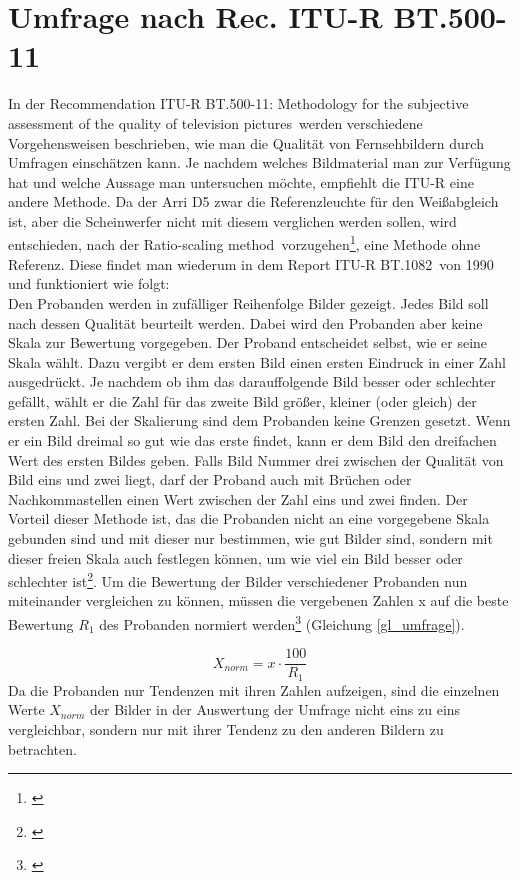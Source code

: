 \section{Umfrage nach Rec. ITU-R  BT.500-11}
\label{sec_umfrageitu}
In der \glqq Recommendation ITU-R BT.500-11: Methodology for the subjective assessment of the 
quality of television pictures\grqq\ werden verschiedene Vorgehensweisen beschrieben, wie man die Qualität von Fernsehbildern durch Umfragen einschätzen kann. Je nachdem welches Bildmaterial man zur Verfügung hat und welche Aussage man untersuchen möchte, empfiehlt die ITU-R eine andere Methode. Da der Arri D5 zwar die Referenzleuchte für den Weißabgleich ist, aber die Scheinwerfer nicht mit diesem verglichen werden sollen, wird entschieden, nach der \glqq Ratio-scaling method\grqq\ vorzugehen\footnote{\cite[10]{itu}}, eine Methode ohne Referenz. Diese findet man wiederum in dem \glqq Report ITU-R BT.1082\grqq\ von 1990 und funktioniert wie folgt:\\
Den Probanden werden in zufälliger Reihenfolge Bilder gezeigt. Jedes  Bild soll nach dessen Qualität beurteilt werden. Dabei wird den Probanden aber keine Skala zur Bewertung vorgegeben. Der Proband entscheidet selbst, wie er seine Skala wählt. Dazu vergibt er dem ersten Bild einen ersten Eindruck in einer Zahl ausgedrückt. Je nachdem ob ihm das darauffolgende Bild besser oder schlechter gefällt, wählt er die Zahl für das zweite Bild größer, kleiner (oder gleich) der ersten Zahl. Bei der Skalierung sind dem Probanden keine Grenzen gesetzt. Wenn er ein Bild dreimal so gut wie das erste findet, kann er dem Bild den dreifachen Wert des ersten Bildes geben. Falls Bild Nummer drei zwischen der Qualität von Bild eins und zwei liegt, darf der Proband auch mit Brüchen oder Nachkommastellen einen Wert zwischen der Zahl eins und zwei finden. Der Vorteil dieser Methode ist, das die Probanden nicht an eine vorgegebene Skala gebunden sind und mit dieser nur bestimmen, wie gut Bilder sind, sondern mit dieser freien Skala auch festlegen können, um wie viel ein Bild besser oder schlechter ist\footnote{\cite[385]{itu90}}. Um die Bewertung der Bilder verschiedener Probanden nun miteinander vergleichen zu können, müssen die vergebenen Zahlen x auf die beste Bewertung $R_{1}$ des Probanden normiert werden\footnote{\cite[387]{itu90}} (Gleichung \ref{gl_umfrage}).

\begin{equation}\label{gl_umfrage}
		X_{norm} = x \cdot \frac{100}{R_{1}}
\end{equation}
Da die Probanden nur Tendenzen mit ihren Zahlen aufzeigen, sind die einzelnen Werte $X_{norm}$ der Bilder in der Auswertung der Umfrage nicht eins zu eins vergleichbar, sondern nur mit ihrer Tendenz zu den anderen Bildern zu betrachten.

